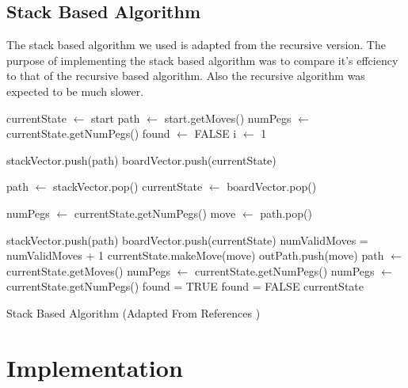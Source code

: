 \documentclass[a4paper]{article}
\begin{document}
\subsection{Stack Based Algorithm}
The stack based algorithm we used is adapted from the recursive version. The purpose of implementing the stack based algorithm was to compare it's effciency to that of the recursive based algorithm. Also the recursive algorithm was expected to be much slower.

\begin{algorithm}[H]
	\begin{algorithmic}[1]
			\State currentState $\leftarrow$ start
			\State path $\leftarrow$ start.getMoves()
			\State numPegs $\leftarrow$ currentState.getNumPegs()
			\State found $\leftarrow$ FALSE
			\State i $\leftarrow$ 1

			\State stackVector.push(path)
			\State boardVector.push(currentState)

				\State path $\leftarrow$ stackVector.pop()
				\State currentState $\leftarrow$ boardVector.pop()

					\State numPegs $\leftarrow$ currentState.getNumPegs()
					\State move $\leftarrow$ path.pop()

						\State stackVector.push(path)
						\State boardVector.push(currentState)
						\State numValidMoves = numValidMoves + 1
						\State currentState.makeMove(move)
						\State outPath.push(move)
						\State path $\leftarrow$ currentState.getMoves()
						\State numPegs $\leftarrow$ currentState.getNumPegs()
					\EndIf
				\EndWhile
				\State numPegs $\leftarrow$ currentState.getNumPegs()
						\State found = TRUE
					\Else
						\State found = FALSE
					\EndIf
				\EndIf
			\EndWhile
			\Return currentState
		\EndProcedure
	\end{algorithmic}
	\caption{Stack Based Algorithm (Adapted From References \cite{lab5})}\label{euclid}
\end{algorithm}

\section{Implementation}
\end{document}
